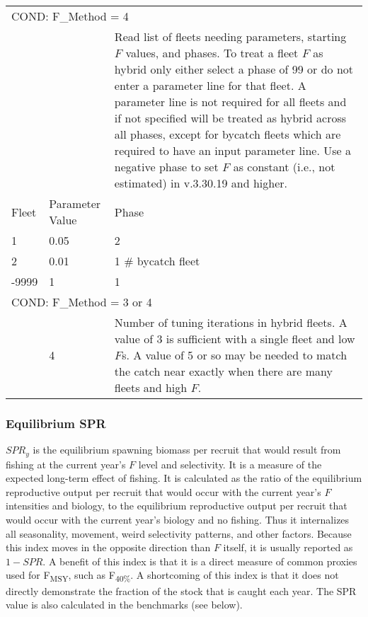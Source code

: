 \begin{longtable}{p{1cm} p{3cm} p{11cm}}
	\multicolumn{3}{l}{COND: F\_Method = 4} \Tstrut\\
	& & Read list of fleets needing parameters, starting $F$ values, and phases. To treat a fleet $F$ as hybrid only either select a phase of 99 or do not enter a parameter line for that fleet. A parameter line is not required for all fleets and if not specified will be treated as hybrid across all phases, except for bycatch fleets which are required to have an input parameter line. Use a negative phase to set $F$ as constant (i.e., not estimated) in v.3.30.19 and higher. \Tstrut\\
	Fleet & Parameter Value & Phase \Tstrut\\
	1 & 0.05 & 2 \\
	2 & 0.01 & 1 \# bycatch fleet \\
	-9999 & 1 & 1 \Bstrut\\
	\hline
 
	\multicolumn{3}{l}{COND: F\_Method = 3 or 4} \Tstrut\\
	& 4 & Number of tuning iterations in hybrid fleets. A value of 3 is sufficient with a single fleet and low $F$s. A value of 5 or so may be needed to match the catch near exactly when there are many fleets and high $F$. \Bstrut\\
	\hline
\end{longtable}

\subsubsection{Equilibrium SPR}
$SPR_y$ is the equilibrium spawning biomass per recruit that would result from fishing at the current year’s $F$ level and selectivity. It is a measure of the expected long-term effect of fishing. It is calculated as the ratio of the equilibrium reproductive output per recruit that would occur with the current year's $F$ intensities and biology, to the equilibrium reproductive output per recruit that would occur with the current year's biology and no fishing. Thus it internalizes all seasonality, movement, weird selectivity patterns, and other factors. Because this index moves in the opposite direction than $F$ itself, it is usually reported as $1-SPR$. A benefit of this index is that it is a direct measure of common proxies used for F\textsubscript{MSY}, such as F\textsubscript {40\%}. A shortcoming of this index is that it does not directly demonstrate the fraction of the stock that is caught each year. The SPR value is also calculated in the benchmarks (see below). 

